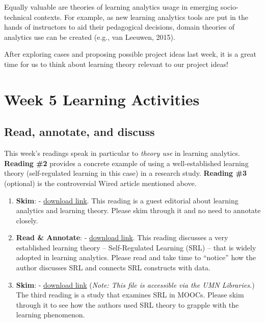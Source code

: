 \documentclass[
]{book}
\providecommand{\tightlist}{%
  \setlength{\itemsep}{0pt}\setlength{\parskip}{0pt}}
\begin{document}
Equally valuable are theories of learning analytics usage in emerging socio-technical contexts. For example, as new learning analytics tools are put in the hands of instructors to aid their pedagogical decisions, domain theories of analytics use can be created (e.g., van Leeuwen, 2015).

After exploring cases and proposing possible project ideas last week, it is a great time for us to think about learning theory relevant to our project ideas!

\hypertarget{week-5-learning-activities}{%
\section{Week 5 Learning Activities}\label{week-5-learning-activities}}

\hypertarget{read-annotate-and-discuss}{%
\subsection{Read, annotate, and discuss}\label{read-annotate-and-discuss}}

This week's readings speak in particular to \emph{theory use} in learning analytics. \textbf{Reading \#2} provides a concrete example of using a well-established learning theory (self-regulated learning in this case) in a research study. \textbf{Reading \#3} (optional) is the controversial Wired article mentioned above.

\begin{enumerate}
\def\labelenumi{\arabic{enumi}.}
\tightlist
\item
  \textbf{Skim}: \citet{wise2015why} - \href{https://files.eric.ed.gov/fulltext/EJ1127063.pdf}{download link}. This reading is a guest editorial about learning analytics and learning theory. Please skim through it and no need to annotate closely.
\item
  \textbf{Read \& Annotate}: \citet{winne2017learning} - \href{https://solaresearch.org/wp-content/uploads/2017/05/chapter21.pdf}{download link}. This reading discusses a very established learning theory -- Self-Regulated Learning (SRL) -- that is widely adopted in learning analytics. Please read and take time to ``notice'' how the author discusses SRL and connects SRL constructs with data.
\item
  \textbf{Skim}: \citet{kizilcec2017selfregulated} - \href{https://www-sciencedirect-com.ezp3.lib.umn.edu/science/article/pii/S0360131516301798}{download link} (\emph{Note: This file is accessible via the UMN Libraries.}) The third reading is a study that examines SRL in MOOCs. Please skim through it to see how the authors used SRL theory to grapple with the learning phenomenon.
\end{enumerate}
\end{document}
